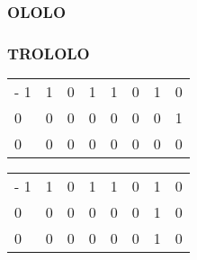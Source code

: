 \documentclass[xetex,mathserif,serif]{beamer}
\begin{document}
	\begin{frame}
		\frametitle{OLOLO}
		\begin{center}
		\end{center}
	\end{frame}

	\begin{frame}
		\frametitle{TROLOLO}
		\begin{tabu} {| X[1 l p] | X[1 l p] | X[1 l p] | X[1 l p] | X[1 l p] | X[1 l p] | X[1 l p] | X[1 l p] |}
			\tabucline-
			\everyrow{\tabucline-}
			1 & 1 & 0 & 1 & 1 & 0 & 1 & 0 \\
			0 & 0 & 0 & 0 & 0 & 0 & 0 & 1 \\
			0 & 0 & 0 & 0 & 0 & 0 & 0 & 0 \\
		\end{tabu}
		\vspace{2cm}
		\begin{tabu} {| X[1 l p] | X[1 l p] | X[1 l p] | X[1 l p] | X[1 l p] | X[1 l p] | X[1 l p] | X[1 l p] |}
			\tabucline-
			\everyrow{\tabucline-}
			1 & 1 & 0 & 1 & 1 & 0 & 1 & 0 \\
			0 & 0 & 0 & 0 & 0 & 0 & 1 & 0 \\
			0 & 0 & 0 & 0 & 0 & 0 & 1 & 0 \\
		\end{tabu}
	\end{frame}
\end{document}

